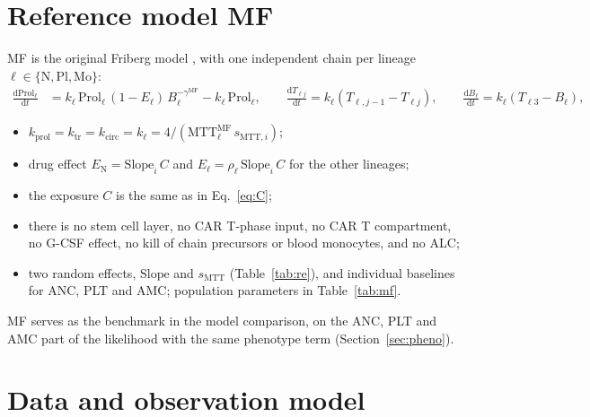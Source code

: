 \documentclass[11pt]{article}
\newcommand{\dd}{\mathrm{d}}
\begin{document}
\section{Reference model MF}\label{sec:mf}
MF is the original Friberg model \citep{friberg2002}, with one independent chain per lineage $\ell\in\{\mathrm{N},\mathrm{Pl},\mathrm{Mo}\}$:
\begin{align}
\frac{\dd \mathrm{Prol}_\ell}{\dd t} &= k_\ell\,\mathrm{Prol}_\ell\,(1-E_\ell)\,B_\ell^{-\gamma^{\mathrm{MF}}} - k_\ell\,\mathrm{Prol}_\ell,\qquad
\frac{\dd T_{\ell j}}{\dd t} = k_\ell(T_{\ell,j-1}-T_{\ell j}),\qquad
\frac{\dd B_\ell}{\dd t} = k_\ell(T_{\ell3}-B_\ell),
\end{align}
\begin{itemize}
\item $k_{\mathrm{prol}}=k_{\mathrm{tr}}=k_{\mathrm{circ}}=k_\ell=4/(\mathrm{MTT}^{\mathrm{MF}}_\ell\,s_{\mathrm{MTT},i})$;
\item drug effect $E_{\mathrm{N}}=\mathrm{Slope}_i\,C$ and $E_\ell=\rho_\ell\,\mathrm{Slope}_i\,C$ for the other lineages;
\item the exposure $C$ is the same as in Eq.~\ref{eq:C};
\item there is no stem cell layer, no CAR T-phase input, no CAR T compartment, no G-CSF effect, no kill of chain precursors or blood monocytes, and no ALC;
\item two random effects, $\mathrm{Slope}$ and $s_{\mathrm{MTT}}$ (Table~\ref{tab:re}), and individual baselines for ANC, PLT and AMC; population parameters in Table~\ref{tab:mf}.
\end{itemize}
MF serves as the benchmark in the model comparison, on the ANC, PLT and AMC part of the likelihood with the same phenotype term (Section~\ref{sec:pheno}).

\section{Data and observation model}\label{sec:obs}
\end{document}
